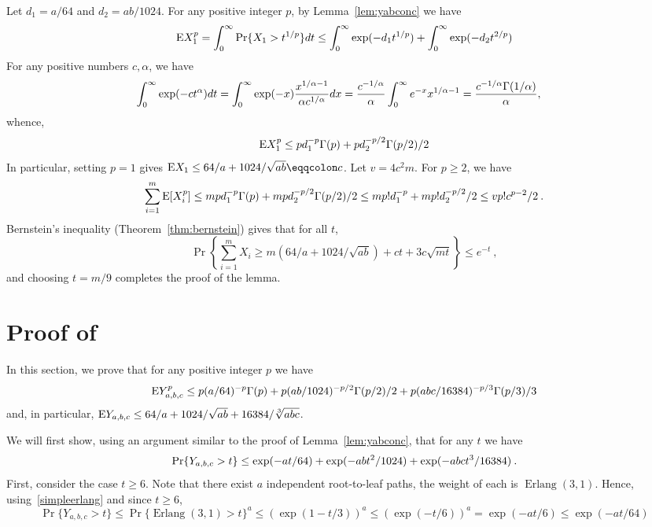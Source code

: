 \documentclass{patmorin}
\DeclareMathOperator{\erlang}{Erlang}
\begin{document}
Let $d_1 = a/64$ and $d_2=ab/1024$.
For any positive integer $p$, by Lemma~\ref{lem:yabconc} we have
\[
\mathrm{E} X_1^p = \int_0^{\infty} \Pr \{X_1>t^{1/p}\}dt
\leq
\int_0^{\infty} \exp(-d_1 t^{1/p}) + \int_0^{\infty} \exp(-d_2 t^{2/p})
\]
For any positive numbers $c,\alpha$, we have
\begin{align}
\int_0^{\infty} \exp(-c t^{\alpha}) dt
& = 
\int_0^{\infty} \exp(-x) \frac {x^{1/\alpha-1}}{\alpha c^{1/\alpha}}dx
=
\frac{c^{-1/\alpha}}{\alpha}\int_0^{\infty}
e^{-x}x^{1/\alpha-1}
= \frac{c^{-1/\alpha}\Gamma(1/\alpha)}{\alpha},
\eqlabel{expintegral}
\end{align}
whence,
\[
\mathrm{E} X_1^p \leq pd_1^{-p}\Gamma(p)
+ pd_2^{-p/2}\Gamma(p/2)/2
\]
In particular, setting $p=1$ gives $\E X_1 \leq 64/a+1024/\sqrt{ab}\eqqcolon c$.
Let $v=4c^2m$.
For $p\geq 2$, we have
\begin{align*}
\sum_{i=1}^m \mathrm{E} [X_i^p] 
\leq
mpd_1^{-p}\Gamma(p)
+ mpd_2^{-p/2}\Gamma(p/2)/2
\leq
m p! d_1^{-p}
+ m p! d_2^{-p/2}/2
\leq v p! c^{p-2}/2\:.
\end{align*}
Bernstein's inequality (Theorem~\ref{thm:bernstein}) gives that for all $t$,
\[
\Pr\left\{\sum_{i=1}^m X_i \geq 
m \left(64/a+1024/\sqrt{ab}\right)
+ ct + 3c\sqrt {mt} \right\} \leq e^{-t}\:,
\]
and choosing $t=m/9$ completes the proof of the lemma.


\section{Proof of~}
In this section, we prove that for any positive integer $p$ we have
\[
\mathrm{E} Y_{a,b,c}^p \leq
 p (a/64)^{-p}\Gamma(p)
+ p(ab/1024)^{-p/2}\Gamma(p/2)/2
+ p(abc/16384)^{-p/3}\Gamma(p/3)/3
\]
and, in particular,
$\mathrm{E} Y_{a,b,c} \leq 64/a+1024/\sqrt{ab} + 16384/\sqrt[3]{abc}$.


We will first show, using an argument similar to the proof of Lemma~\ref{lem:yabconc}, that
for any $t$ we have
\begin{equation}
\eqlabel{tailyabc}
\Pr\{Y_{a,b,c}>t\} \leq \exp(-at/64)+\exp(-abt^2/1024)+\exp(-abct^3/16384) \:.
\end{equation}
First, consider the case $t\geq6$.
Note that there exist $a$ independent root-to-leaf paths, the weight of each is $\erlang(3,1)$.
Hence, using~\eqref{simpleerlang} and since $t\geq6$,
\[
\Pr\{Y_{a,b,c}>t\}
\leq
\Pr\{\erlang(3,1)>t\}^a
\leq
(\exp(1-t/3))^a
\leq
(\exp(-t/6))^a
=\exp(-at/6) \leq\exp(-at/64)
\]
\end{document}
